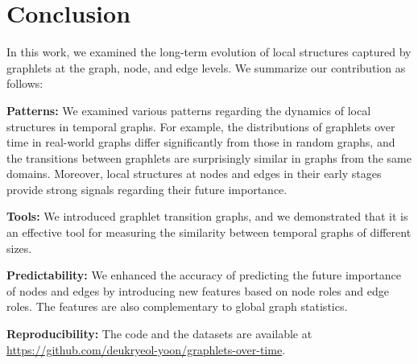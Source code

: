 \section{Conclusion}\label{section:conclusion}

In this work, we examined the long-term evolution of local structures captured by graphlets at the graph, node, and edge levels.
We summarize our contribution as follows:
\bit
\item \textbf{Patterns:} We examined various patterns regarding the dynamics of local structures in temporal graphs. For example, the distributions of graphlets over time in real-world graphs differ significantly from those in random graphs, and the transitions between graphlets are surprisingly similar in graphs from the same domains.
Moreover, local structures at nodes and edges in their early stages provide strong signals regarding their future importance.


\item \textbf{Tools:} We introduced graphlet transition graphs, and we demonstrated that it is an effective tool for measuring the similarity between temporal graphs of different sizes.

\item \textbf{Predictability:} We enhanced the accuracy of predicting the future importance of nodes and edges by introducing new features based on node roles and edge roles. The features are also complementary to global graph statistics.
\eit

\noindent\textbf{Reproducibility:}  The code and the datasets are available at %
\url{https://github.com/deukryeol-yoon/graphlets-over-time}.


